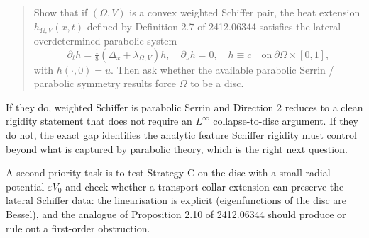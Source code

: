 \documentclass[11pt]{article}
\newcommand{\Om}{\Omega}
\newcommand{\eps}{\varepsilon}
\newcommand{\1}{\mathbf 1}
\newcommand{\nor}{\partial_\nu}
\begin{document}
\begin{quote}
Show that if $(\Om,V)$ is a convex weighted Schiffer pair, the heat
extension $h_{\Om,V}(x,t)$ defined by Definition 2.7 of 2412.06344
satisfies the lateral overdetermined parabolic system
\[
    \partial_t h=\tfrac{1}{8}(\Delta_x+\lambda_{\Om,V})h,\quad
    \nor h=0,\quad h\equiv c\quad \text{on}\ \partial\Om\times[0,1],
\]
with $h(\cdot,0)=u$. Then ask whether the available parabolic Serrin /
parabolic symmetry results force $\Om$ to be a disc.
\end{quote}

If they do, weighted Schiffer is parabolic Serrin and Direction 2
reduces to a clean rigidity statement that does not require an
$L^\infty$ collapse-to-disc argument. If they do not, the exact gap
identifies the analytic feature Schiffer rigidity must control beyond
what is captured by parabolic theory, which is the right next question.

A second-priority task is to test Strategy C on the disc with a small
radial potential $\eps V_0$ and check whether a transport-collar
extension can preserve the lateral Schiffer data: the linearisation is
explicit (eigenfunctions of the disc are Bessel), and the analogue of
Proposition 2.10 of 2412.06344 should produce or rule out a
first-order obstruction.
\end{document}
